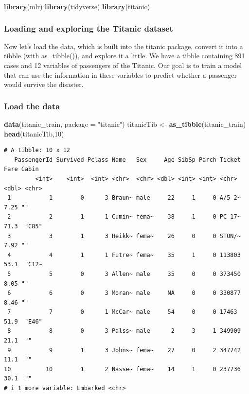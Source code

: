 \documentclass[
]{article}
\newenvironment{Shaded}{\begin{snugshade}}{\end{snugshade}}
\newcommand{\AttributeTok}[1]{\textcolor[rgb]{0.13,0.29,0.53}{#1}}
\newcommand{\DecValTok}[1]{\textcolor[rgb]{0.00,0.00,0.81}{#1}}
\newcommand{\FunctionTok}[1]{\textcolor[rgb]{0.13,0.29,0.53}{\textbf{#1}}}
\newcommand{\NormalTok}[1]{#1}
\newcommand{\OtherTok}[1]{\textcolor[rgb]{0.56,0.35,0.01}{#1}}
\newcommand{\StringTok}[1]{\textcolor[rgb]{0.31,0.60,0.02}{#1}}
\begin{document}
\begin{Shaded}
\begin{Highlighting}[]
\FunctionTok{library}\NormalTok{(mlr)}
\FunctionTok{library}\NormalTok{(tidyverse)}
\FunctionTok{library}\NormalTok{(titanic)}
\end{Highlighting}
\end{Shaded}

\subsubsection{Loading and exploring the Titanic
dataset}\label{loading-and-exploring-the-titanic-dataset}

Now let's load the data, which is built into the titanic package,
convert it into a tibble (with as\_tibble()), and explore it a little.
We have a tibble containing 891 cases and 12 variables of passengers of
the Titanic. Our goal is to train a model that can use the information
in these variables to predict whether a passenger would survive the
disaster.

\subsubsection{Load the data}\label{load-the-data}

\begin{Shaded}
\begin{Highlighting}[]
\FunctionTok{data}\NormalTok{(titanic\_train, }\AttributeTok{package =} \StringTok{"titanic"}\NormalTok{)}
\NormalTok{titanicTib }\OtherTok{\textless{}{-}} \FunctionTok{as\_tibble}\NormalTok{(titanic\_train)}
\FunctionTok{head}\NormalTok{(titanicTib,}\DecValTok{10}\NormalTok{)}
\end{Highlighting}
\end{Shaded}

\begin{verbatim}
# A tibble: 10 x 12
   PassengerId Survived Pclass Name   Sex     Age SibSp Parch Ticket  Fare Cabin
         <int>    <int>  <int> <chr>  <chr> <dbl> <int> <int> <chr>  <dbl> <chr>
 1           1        0      3 Braun~ male     22     1     0 A/5 2~  7.25 ""   
 2           2        1      1 Cumin~ fema~    38     1     0 PC 17~ 71.3  "C85"
 3           3        1      3 Heikk~ fema~    26     0     0 STON/~  7.92 ""   
 4           4        1      1 Futre~ fema~    35     1     0 113803 53.1  "C12~
 5           5        0      3 Allen~ male     35     0     0 373450  8.05 ""   
 6           6        0      3 Moran~ male     NA     0     0 330877  8.46 ""   
 7           7        0      1 McCar~ male     54     0     0 17463  51.9  "E46"
 8           8        0      3 Palss~ male      2     3     1 349909 21.1  ""   
 9           9        1      3 Johns~ fema~    27     0     2 347742 11.1  ""   
10          10        1      2 Nasse~ fema~    14     1     0 237736 30.1  ""   
# i 1 more variable: Embarked <chr>
\end{verbatim}
\end{document}
